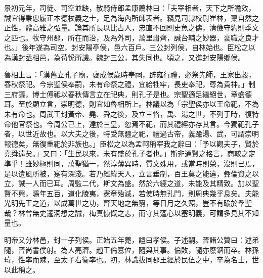 \begin{pinyinscope}
景初元年，司徒、司空並缺，散騎侍郎孟康薦林曰：「夫宰相者，天下之所瞻效，誠宜得秉忠履正本德杖義之士，足為海內所師表者。竊見司隷校尉崔林，稟自然之正性，體高雅之弘量。論其所長以比古人，忠直不回則史魚之儔，清儉守約則季文之匹也。牧守州郡，所在而治，及為外司，萬里肅齊，誠台輔之妙器，衮職之良才也。」後年遂為司空，封安陽亭侯，邑六百戶。三公封列侯，自林始也。臣松之以為漢封丞相邑，為荀恱所譏。魏封三公，其失同也。頃之，又進封安陽鄉侯。

魯相上言：「漢舊立孔子廟，襃成侯歲時奉祠，辟雍行禮，必祭先師，王家出穀，春秋祭祀。今宗聖侯奉嗣，未有命祭之禮，宜給牲牢，長吏奉祀，尊為貴神。」制三府議，博士傅祗以春秋傳言立在祀典，則孔子是也。宗聖適足繼絕世，章盛德耳。至於顯立言，崇明德，則宜如魯相所上。林議以為「宗聖侯亦以王命祀，不為未有命也。周武王封黃帝、堯、舜之後，及立三恪，禹、湯之世，不列于時，復特命他官祭也。今周公已上，達於三皇，忽焉不祀，而其禮經亦存其言。今獨祀孔子者，以世近故也。以大夫之後，特受無疆之祀，禮過古帝，義踰湯、武，可謂崇明報德矣，無復重祀於非族也。」臣松之以為孟軻稱宰我之辭曰：「予以觀夫子，賢於堯舜遠矣。」又曰：「生民以來，未有盛於孔子者也。」斯非通賢之格言，商較之定準乎！雖妙極則同，萬聖猶一，然淳薄異時，質文殊用，或當時則榮，沒則已焉，是以遺風所被，寔有深淺。若乃經緯天人，立言垂制，百王莫之能違，彝倫資之以立，誠一人而已耳。周監二代，斯文為盛。然於六經之道，未能及其精致。加以聖賢不興，曠年五百，道化陵夷，憲章殆滅，若使時無孔門，則周典幾乎息矣。夫能光明先王之道，以成萬世之功，齊天地之無窮，等日月之久照，豈不有踰於羣聖哉？林曾無史遷洞想之誠，梅真慷慨之志，而守其蓬心以塞明義，可謂多見其不知量也。

明帝又分林邑，封一子列侯。正始五年薨，謚曰孝侯。子述嗣。晉諸公贊曰：述弟隨，晉尚書僕射。為人亮濟。趙王倫篡位，隨與其事。倫敗，隨亦廢錮而卒。林孫瑋，性率而踈，至太子右衞率也。初，林識拔同郡王經於民伍之中，卒為名士，世以此稱之。


\end{pinyinscope}